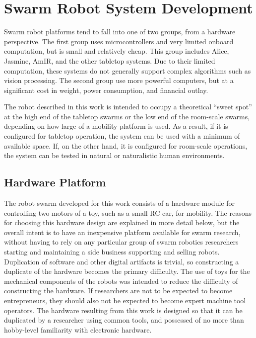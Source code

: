 \chapter{Swarm Robot System Development}

Swarm robot platforms tend to fall into one of two groups, from a hardware perspective. 
The first group uses microcontrollers and very limited onboard computation, but is small and relatively cheap.
This group includes Alice, Jasmine, AmIR, and the other tabletop systems. 
Due to their limited computation, these systems do not generally support complex algorithms such as vision processing. 
The second group use more powerful computers, but at a significant cost in weight, power consumption, and financial outlay.

The robot described in this work is intended to occupy a theoretical ``sweet spot'' at the high end of the tabletop swarms or the low end of the room-scale swarms, depending on how large of a mobility platform is used. 
As a result, if it is configured for tabletop operation, the system can be used with a minimum of available space. 
If, on the other hand, it is configured for room-scale operations, the system can be tested in natural or naturalistic human environments. 

\section{Hardware Platform}

The robot swarm developed for this work consists of a hardware module for controlling two motors of a toy, such as a small RC car, for mobility. 
The reasons for choosing this hardware design are explained in more detail below, but the overall intent is to have an inexpensive platform available for swarm research, without having to rely on any particular group of swarm robotics researchers starting and maintaining a side business supporting and selling robots.
Duplication of software and other digital artifacts is trivial, so constructing a duplicate of the hardware becomes the primary difficulty. 
The use of toys for the mechanical components of the robots was intended to reduce the difficulty of constructing the hardware. 
If researchers are not to be expected to become entrepreneurs, they should also not be expected to become expert machine tool operators.
The hardware resulting from this work is designed so that it can be duplicated by a researcher using common tools, and possessed of no more than hobby-level familiarity with electronic hardware.

